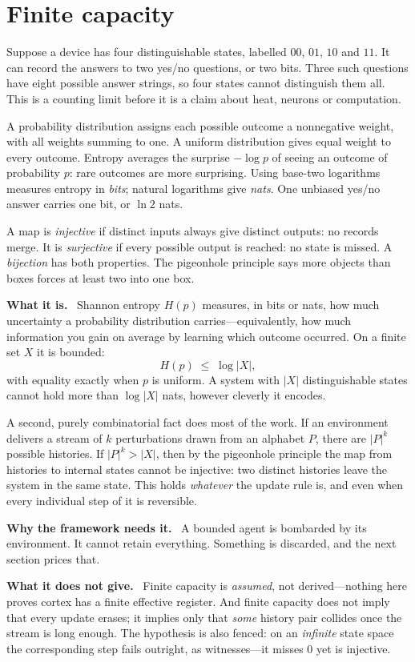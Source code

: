 \documentclass[11pt]{article}
\newcommand{\what}{\par\smallskip\noindent\textbf{What it is.}\ }
\newcommand{\why}{\par\smallskip\noindent\textbf{Why the framework needs it.}\ }
\newcommand{\scope}{\par\smallskip\noindent\textbf{What it does not give.}\ }
\newcommand{\id}[1]{{\small\ttfamily\seqsplit{#1}}}
\begin{document}
\section{Finite capacity}

Suppose a device has four distinguishable states, labelled $00$, $01$, $10$
and $11$. It can record the answers to two yes/no questions, or two bits.
Three such questions have eight possible answer strings, so four states
cannot distinguish them all. This is a counting limit before it is a claim
about heat, neurons or computation.

A probability distribution assigns each possible outcome a nonnegative
weight, with all weights summing to one. A uniform distribution gives equal
weight to every outcome. Entropy averages the surprise $-\log p$ of seeing
an outcome of probability $p$: rare outcomes are more surprising. Using
base-two logarithms measures entropy in \emph{bits}; natural logarithms give
\emph{nats}. One unbiased yes/no answer carries one bit, or $\ln2$ nats.

A map is \emph{injective} if distinct inputs always give distinct outputs:
no records merge. It is \emph{surjective} if every possible output is reached:
no state is missed. A \emph{bijection} has both properties. The pigeonhole
principle says more objects than boxes forces at least two into one box.

\what
Shannon entropy $H(p)$ measures, in bits or nats, how much uncertainty a
probability distribution carries---equivalently, how much information you gain
on average by learning which outcome occurred. On a finite set $X$ it is
bounded:
\[
 H(p) \;\le\; \log|X| ,
\]
with equality exactly when $p$ is uniform. A system with $|X|$ distinguishable
states cannot hold more than $\log|X|$ nats, however cleverly it encodes.

A second, purely combinatorial fact does most of the work. If an environment
delivers a stream of $k$ perturbations drawn from an alphabet $P$, there are
$|P|^k$ possible histories. If $|P|^k > |X|$, then by the pigeonhole principle
the map from histories to internal states cannot be injective: two distinct
histories leave the system in the same state. This holds \emph{whatever} the
update rule is, and even when every individual step of it is reversible.

\why
A bounded agent is bombarded by its environment. It cannot retain everything.
Something is discarded, and the next section prices that.

\scope
Finite capacity is \emph{assumed}, not derived---nothing here proves cortex
has a finite effective register. And finite capacity does not imply that every
update erases; it implies only that \emph{some} history pair collides once the
stream is long enough. The hypothesis is also fenced: on an \emph{infinite}
state space the corresponding step fails outright, as \id{Nat.succ}
witnesses---it misses $0$ yet is injective.
\end{document}
